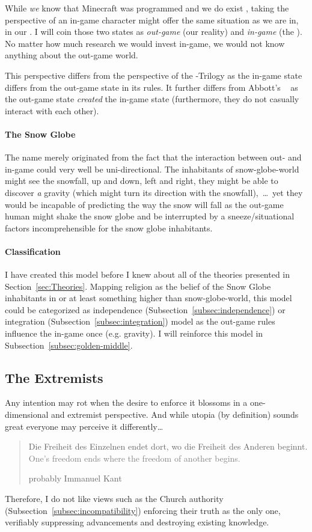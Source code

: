 While \emph{we} know that Minecraft was programmed and we do exist , taking the perspective of an in-game character might offer the same situation as we are in, in our . I will coin those two states as \emph{out-game} (our reality) and \emph{in-game} (the ).
No matter how much research we would invest in-game, we would not know anything about the out-game world.

This perspective differs from the perspective of the -Trilogy as the in-game state differs from the out-game state in its rules.
It further differs from Abbott's ~\cite{abbott1987flatland} as the out-game state \emph{created} the in-game state (furthermore, they do not casually interact with each other).

\paragraph{The Snow Globe}
The name  merely originated from the fact that the interaction between out- and in-game could very well be uni-directional.
The inhabitants of snow-globe-world might see the snowfall, up and down, left and right, they might be able to discover \textit{a} gravity (which might turn its direction with the snowfall),~\ldots\ yet they would be incapable of predicting the way the snow will fall as the out-game human might shake the snow globe and be interrupted by a sneeze/situational factors incomprehensible for the snow globe inhabitants.


\paragraph{Classification}
I have created this model before I knew about all of the theories presented in Section~\ref{sec:Theories}. Mapping religion as the belief of the Snow Globe inhabitants in  or at least something higher than snow-globe-world, this model could be categorized as independence (Subsection~\ref{subsec:independence}) or integration (Subsection~\ref{subsec:integration}) model as the out-game rules influence the in-game once (e.g. gravity).
I will reinforce this model in Subsection~\ref{subsec:golden-middle}.

\subsection{The Extremists}
Any intention may rot when the desire to enforce it blossoms in a one-dimensional and extremist perspective.
And while utopia (by definition) sounds great everyone may perceive it differently\ldots
\blockquote[probably Immanuel Kant]{Die Freiheit des Einzelnen endet dort, wo die Freiheit des Anderen beginnt.\\\textcolor{gray}{One's freedom ends where the freedom of another begins.}}
Therefore, I do not like views such as the Church authority (Subsection~\ref{subsec:incompatibility}) enforcing their truth as the only one, verifiably suppressing advancements and destroying existing knowledge.

